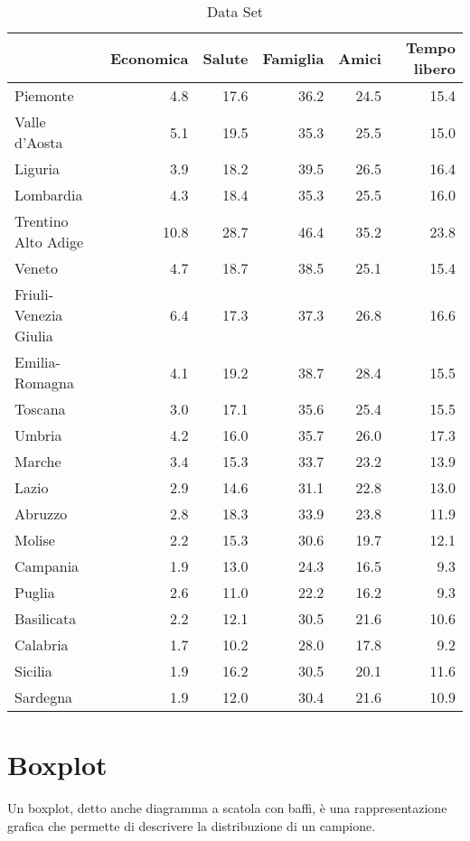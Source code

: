 \documentclass[]{book}
\begin{document}
\begin{table}

\caption{\label{tab:dataframe}Data Set}
\centering
\begin{tabular}[t]{l|r|r|r|r|r}
\hline
  & Economica & Salute & Famiglia & Amici & Tempo libero\\
\hline
Piemonte & 4.8 & 17.6 & 36.2 & 24.5 & 15.4\\
\hline
Valle d'Aosta & 5.1 & 19.5 & 35.3 & 25.5 & 15.0\\
\hline
Liguria & 3.9 & 18.2 & 39.5 & 26.5 & 16.4\\
\hline
Lombardia & 4.3 & 18.4 & 35.3 & 25.5 & 16.0\\
\hline
Trentino Alto Adige & 10.8 & 28.7 & 46.4 & 35.2 & 23.8\\
\hline
Veneto & 4.7 & 18.7 & 38.5 & 25.1 & 15.4\\
\hline
Friuli-Venezia Giulia & 6.4 & 17.3 & 37.3 & 26.8 & 16.6\\
\hline
Emilia-Romagna & 4.1 & 19.2 & 38.7 & 28.4 & 15.5\\
\hline
Toscana & 3.0 & 17.1 & 35.6 & 25.4 & 15.5\\
\hline
Umbria & 4.2 & 16.0 & 35.7 & 26.0 & 17.3\\
\hline
Marche & 3.4 & 15.3 & 33.7 & 23.2 & 13.9\\
\hline
Lazio & 2.9 & 14.6 & 31.1 & 22.8 & 13.0\\
\hline
Abruzzo & 2.8 & 18.3 & 33.9 & 23.8 & 11.9\\
\hline
Molise & 2.2 & 15.3 & 30.6 & 19.7 & 12.1\\
\hline
Campania & 1.9 & 13.0 & 24.3 & 16.5 & 9.3\\
\hline
Puglia & 2.6 & 11.0 & 22.2 & 16.2 & 9.3\\
\hline
Basilicata & 2.2 & 12.1 & 30.5 & 21.6 & 10.6\\
\hline
Calabria & 1.7 & 10.2 & 28.0 & 17.8 & 9.2\\
\hline
Sicilia & 1.9 & 16.2 & 30.5 & 20.1 & 11.6\\
\hline
Sardegna & 1.9 & 12.0 & 30.4 & 21.6 & 10.9\\
\hline
\end{tabular}
\end{table}

\section{Boxplot}\label{boxplot}

Un boxplot, detto anche diagramma a scatola con baffi, è una
rappresentazione grafica che permette di descrivere la distribuzione di
un campione.
\end{document}
